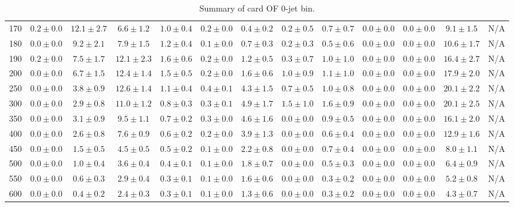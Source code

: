 \begin{table}
{\begin{center}
\begin{tabular}{l | c c | c c c c c c c c  | c c}
170 & $0.2\pm0.0$ & $12.1\pm2.7$ & $6.6\pm1.2$ & $1.0\pm0.4$ & $0.2\pm0.0$ & $0.4\pm0.2$ & $0.2\pm0.5$ & $0.7\pm0.7$ & $0.0\pm0.0$ & $0.0\pm0.0$ & $9.1\pm1.5$ & N/A \\ 
180 & $0.0\pm0.0$ & $9.2\pm2.1$ & $7.9\pm1.5$ & $1.2\pm0.4$ & $0.1\pm0.0$ & $0.7\pm0.3$ & $0.2\pm0.3$ & $0.5\pm0.6$ & $0.0\pm0.0$ & $0.0\pm0.0$ & $10.6\pm1.7$ & N/A \\ 
190 & $0.2\pm0.0$ & $7.5\pm1.7$ & $12.1\pm2.3$ & $1.6\pm0.6$ & $0.2\pm0.0$ & $1.2\pm0.5$ & $0.3\pm0.7$ & $1.0\pm1.0$ & $0.0\pm0.0$ & $0.0\pm0.0$ & $16.4\pm2.7$ & N/A \\
200 & $0.0\pm0.0$ & $6.7\pm1.5$ & $12.4\pm1.4$ & $1.5\pm0.5$ & $0.2\pm0.0$ & $1.6\pm0.6$ & $1.0\pm0.9$ & $1.1\pm1.0$ & $0.0\pm0.0$ & $0.0\pm0.0$ & $17.9\pm2.0$ & N/A \\
250 & $0.0\pm0.0$ & $3.8\pm0.9$ & $12.6\pm1.4$ & $1.1\pm0.4$ & $0.4\pm0.1$ & $4.3\pm1.5$ & $0.7\pm0.5$ & $1.0\pm0.8$ & $0.0\pm0.0$ & $0.0\pm0.0$ & $20.1\pm2.2$ & N/A \\
300 & $0.0\pm0.0$ & $2.9\pm0.8$ & $11.0\pm1.2$ & $0.8\pm0.3$ & $0.3\pm0.1$ & $4.9\pm1.7$ & $1.5\pm1.0$ & $1.6\pm0.9$ & $0.0\pm0.0$ & $0.0\pm0.0$ & $20.1\pm2.5$ & N/A \\
350 & $0.0\pm0.0$ & $3.1\pm0.9$ & $9.5\pm1.1$ & $0.7\pm0.2$ & $0.3\pm0.0$ & $4.6\pm1.6$ & $0.0\pm0.0$ & $0.9\pm0.5$ & $0.0\pm0.0$ & $0.0\pm0.0$ & $16.1\pm2.0$ & N/A \\
400 & $0.0\pm0.0$ & $2.6\pm0.8$ & $7.6\pm0.9$ & $0.6\pm0.2$ & $0.2\pm0.0$ & $3.9\pm1.3$ & $0.0\pm0.0$ & $0.6\pm0.4$ & $0.0\pm0.0$ & $0.0\pm0.0$ & $12.9\pm1.6$ & N/A \\
450 & $0.0\pm0.0$ & $1.5\pm0.5$ & $4.5\pm0.5$ & $0.5\pm0.2$ & $0.1\pm0.0$ & $2.2\pm0.8$ & $0.0\pm0.0$ & $0.7\pm0.4$ & $0.0\pm0.0$ & $0.0\pm0.0$ & $8.0\pm1.1$ & N/A \\ 
500 & $0.0\pm0.0$ & $1.0\pm0.4$ & $3.6\pm0.4$ & $0.4\pm0.1$ & $0.1\pm0.0$ & $1.8\pm0.7$ & $0.0\pm0.0$ & $0.5\pm0.3$ & $0.0\pm0.0$ & $0.0\pm0.0$ & $6.4\pm0.9$ & N/A \\ 
550 & $0.0\pm0.0$ & $0.6\pm0.3$ & $2.9\pm0.4$ & $0.3\pm0.1$ & $0.1\pm0.0$ & $1.6\pm0.6$ & $0.0\pm0.0$ & $0.3\pm0.2$ & $0.0\pm0.0$ & $0.0\pm0.0$ & $5.2\pm0.8$ & N/A \\ 
600 & $0.0\pm0.0$ & $0.4\pm0.2$ & $2.4\pm0.3$ & $0.3\pm0.1$ & $0.1\pm0.0$ & $1.3\pm0.6$ & $0.0\pm0.0$ & $0.3\pm0.2$ & $0.0\pm0.0$ & $0.0\pm0.0$ & $4.3\pm0.7$ & N/A \\ 
\hline
\end{tabular}
\end{center}
}
\caption{Summary of card OF 0-jet bin.}
\end{table}
